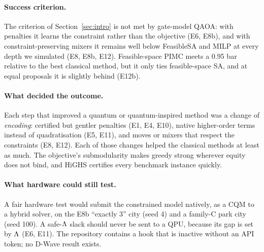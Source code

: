 \paragraph{Success criterion.} The criterion of Section~\ref{sec:intro} is not met by gate-model
QAOA: with penalties it learns the constraint rather than the objective (E6, E8b), and with
constraint-preserving mixers it remains well below FeasibleSA and MILP at every depth we simulated
(E8, E8b, E12). Feasible-space PIMC meets a 0.95 bar relative to the best classical method, but it
only ties feasible-space SA, and at equal proposals it is slightly behind (E12b).

\paragraph{What decided the outcome.} Each step that improved a quantum or quantum-inspired method
was a change of \emph{encoding}: certified but gentler penalties (E1, E4, E10), native higher-order
terms instead of quadratisation (E5, E11), and moves or mixers that respect the constraints (E8,
E12). Each of those changes helped the classical methods at least as much. The objective's
submodularity makes greedy strong wherever equity does not bind, and HiGHS certifies every
benchmark instance quickly.

\paragraph{What hardware could still test.} A fair hardware test would submit the constrained
model natively, as a CQM to a hybrid solver, on the E8b ``exactly 3'' city (seed 4) and a family-C
park city (seed 100). A safe-$\Lambda$ slack \QUBO{} should never be sent to a QPU, because its gap is
set by $\Lambda$ (E6, E11). The repository contains a hook that is inactive without an API token; no
D-Wave result exists.
